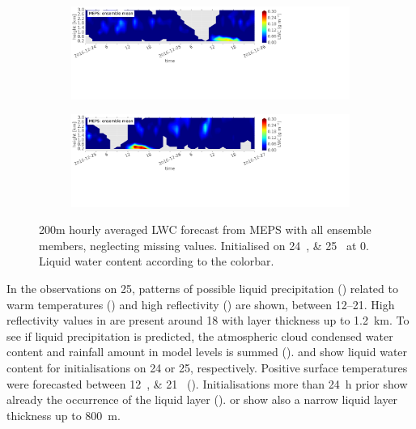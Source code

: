 \begin{figure}[t]
	\centering
	\begin{subfigure}[b]{\textwidth}
		\centering
		\includegraphics[trim={0.cm 11.5cm 18.5cm 0.4cm},clip,width=\textwidth]{./fig_vert_LWC_EM/20161224}
		\caption{}\label{fig:LWC:24}
	\end{subfigure}
	\begin{subfigure}[b]{\textwidth}
		\centering
		\includegraphics[trim={0.cm 10cm 18.5cm 0.4cm},clip,width=\textwidth]{./fig_vert_LWC_EM/20161225}
		\caption{}\label{fig:LWC:25}
	\end{subfigure}
	\caption{200m hourly averaged LWC forecast from MEPS with all ensemble members, neglecting missing values.
		Initialised on \SIlist{24;25}{\dec} at \SI{0}{\UTC}. Liquid water content according to the colorbar.}\label{fig:LWC:2425}
\end{figure}
In the observations on \SI{25}{\dec}, patterns of possible liquid precipitation () related to warm temperatures () and high reflectivity () are shown, between \SIrange{12}{21}{\UTC}. High reflectivity values in  are present around \SI{18}{\UTC} with layer thickness up to \SI{1.2}{\km}. 
To see if liquid precipitation is predicted, the atmospheric cloud condensed water content and rainfall amount in model levels is summed ().  and  show liquid water content for initialisations on \SI{24}{\dec} or \SI{25}{\dec}, respectively. 
Positive surface temperatures were forecasted between \SIlist{12;21}{\UTC} (). Initialisations more than \SI{24}{\hour} prior show already the occurrence of the liquid layer ().  or  show also a narrow liquid layer thickness up to \SI{800}{\metre}. 
